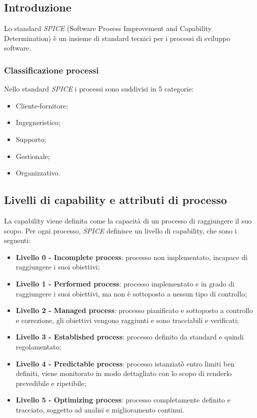 \subsection{Introduzione}
Lo standard \textit{SPICE} (Software Process Improvement and Capability Determination) è un insieme di
standard tecnici per i processi di sviluppo software.

\subsubsection{Classificazione processi}
Nello standard \textit{SPICE} i processi sono suddivisi in 5 categorie:
\begin{itemize}
	\item Cliente-fornitore;
	\item Ingegneristico;
	\item Supporto;
	\item Gestionale;
	\item Organizzativo.
\end{itemize}

\subsection{Livelli di capability e attributi di processo}
La capability viene definita come la capacità di un processo di raggiungere il suo scopo. Per ogni processo, \textit{SPICE} definisce un livello di capability, che sono i seguenti:
\begin{itemize}
	\item \textbf{Livello 0 - Incomplete process}: processo non implementato, incapace di raggiungere i suoi
	obiettivi;
	\item \textbf{Livello 1 - Performed process}: processo implementato e in grado di raggiungere i suoi obiettivi,
	ma non è sottoposto a nessun tipo di controllo;
	\item \textbf{Livello 2 - Managed process}: processo pianificato e sottoposto a controllo e correzione, gli
	obiettivi vengono raggiunti e sono tracciabili e verificati;
	\item \textbf{Livello 3 - Established process}: processo definito da standard e quindi regolamentato;
	\item \textbf{Livello 4 - Predictable process}: processo istanziato\G{} entro limiti ben definiti, viene monitorato
	in modo dettagliato con lo scopo di renderlo prevedibile e ripetibile;
	\item \textbf{Livello 5 - Optimizing process}: processo completamente definito e tracciato, soggetto ad analisi
	e miglioramento continui.
\end{itemize}
 
